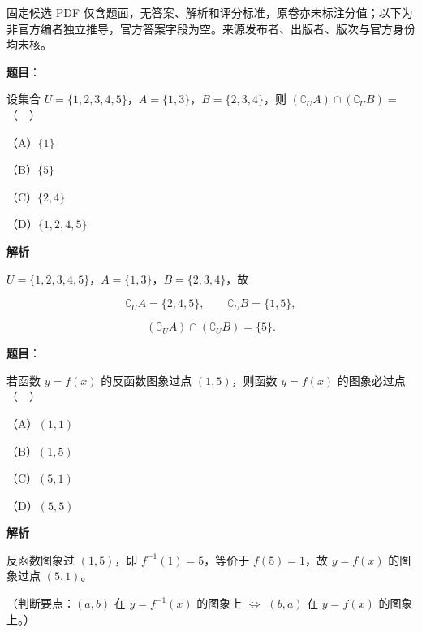 

\begin{gktip}
固定候选 PDF 仅含题面，无答案、解析和评分标准，原卷亦未标注分值；以下为非官方编者独立推导，官方答案字段为空。来源发布者、出版者、版次与官方身份均未核。
\end{gktip}

\begin{answer}

\textbf{题目}：

设集合 $U=\{1,2,3,4,5\}$，$A=\{1,3\}$，$B=\{2,3,4\}$，则 $(\complement_UA)\cap(\complement_UB)=$（　）

（A）$\{1\}$

（B）$\{5\}$

（C）$\{2,4\}$

（D）$\{1,2,4,5\}$

\textbf{解析}

$U=\{1,2,3,4,5\}$，$A=\{1,3\}$，$B=\{2,3,4\}$，故

\nopagebreak[4]
\[\complement_UA=\{2,4,5\},\qquad \complement_UB=\{1,5\},\]

\nopagebreak[4]
\[(\complement_UA)\cap(\complement_UB)=\{5\}.\]


\end{answer}
\begin{answer}

\textbf{题目}：

若函数 $y=f(x)$ 的反函数图象过点 $(1,5)$，则函数 $y=f(x)$ 的图象必过点（　）

（A）$(1,1)$

（B）$(1,5)$

（C）$(5,1)$

（D）$(5,5)$

\textbf{解析}

反函数图象过 $(1,5)$，即 $f^{-1}(1)=5$，等价于 $f(5)=1$，故 $y=f(x)$ 的图象过点 $(5,1)$。

（判断要点：$(a,b)$ 在 $y=f^{-1}(x)$ 的图象上 $\Leftrightarrow$ $(b,a)$ 在 $y=f(x)$ 的图象上。）


\end{answer}
